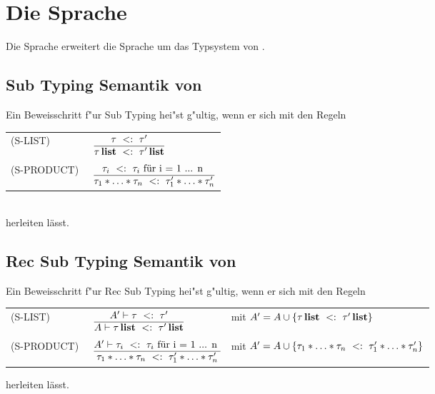 \section{Die Sprache \LTHREESUB}
Die Sprache \LTWOSUB erweitert die Sprache \LTWOSUB um das Typsystem von \LTHREE. 

\subsection{Sub Typing Semantik von \LTHREESUB}

Ein Beweisschritt f"ur Sub Typing hei"st g"ultig, wenn er sich mit den Regeln  \\[5mm]
  \begin{tabular}{ll}
    \mbox{(S-LIST)\ }      & $\RULE{\subtype{\tau} {\tau'} }
                              {\subtype{\listtype{\tau}} {\listtype{\tau'}}}$ \\[4mm]
    \mbox{(S-PRODUCT)\ }      & $\RULE{\subtype{\tau_i} {\tau_i} \text{ f\"ur  i = 1 ... n }}
                              {\subtype{\tau_1 * \ldots * \tau_n} {\tau_1' * \ldots * \tau_n'}}$ \\[4mm]
  \end{tabular} \\[7mm]

herleiten l\"asst.

\subsection{Rec Sub Typing Semantik von \LTHREESUB}

Ein Beweisschritt f"ur Rec Sub Typing hei"st g"ultig, wenn er sich mit den Regeln  \\[5mm]
 \begin{tabular}{lll}
    \mbox{(S-LIST)\ }      & $\RULE{A' \vdash \subtype{\tau} {\tau'} }
                              {A \vdash \subtype{\listtype{\tau}} {\listtype{\tau'}}}$ 
				& mit $A' = A \cup \{\tau\,\textbf{list}\ <:\ \tau'\,\textbf{list}\}$ \\[4mm]
    \mbox{(S-PRODUCT)\ }      & $\RULE{A' \vdash \subtype{\tau_i} {\tau_i} \text{ f\"ur  i = 1 ... n }}
                              {\subtype{\tau_1 * \ldots * \tau_n} {\tau_1' * \ldots * \tau_n'}}$ 
				& mit $A' = A \cup \{\tau_1 * \ldots * \tau_n\ <:\ \tau_1' * \ldots * \tau_n'\}$ \\[4mm]
          \end{tabular}


herleiten l\"asst.


